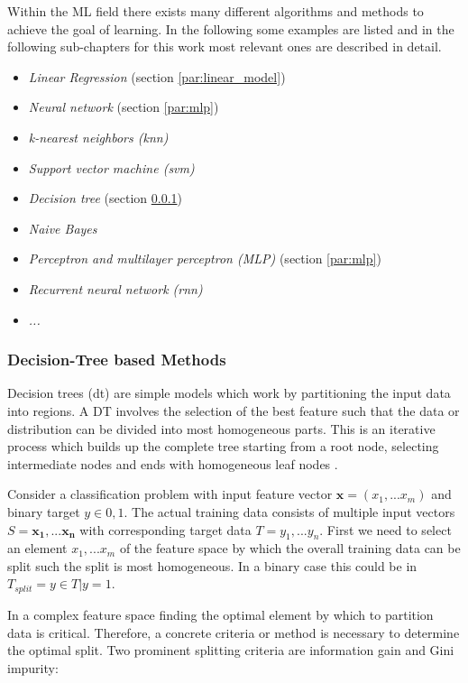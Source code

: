 \documentclass[../main.tex]{subfiles}
\begin{document}
Within the ML field there exists many different algorithms and methods to achieve the goal of learning. In the following some examples are listed and in the following sub-chapters for this work most relevant ones are described in detail.

\begin{itemize}
    \item \emph{Linear Regression} (section \ref{par:linear_model})
    \item \emph{Neural network} (section \ref{par:mlp})
    \item \emph{k-nearest neighbors (\acs{knn})}
    \item \emph{Support vector machine (\acs{svm})}
    \item \emph{Decision tree} (section \ref{ssec:dt})
    \item \emph{Naive Bayes}
    \item \emph{Perceptron and multilayer perceptron (MLP)} (section \ref{par:mlp})
    \item \emph{Recurrent neural network (\acs{rnn})}
    \item \emph{...}
\end{itemize}

\subsubsection{Decision-Tree based Methods} \label{ssec:dt}

Decision trees (\acs{dt}) are simple models which work by partitioning the input data into regions. A DT involves the selection of the best feature such that the data or distribution can be divided into most homogeneous parts. This is an iterative process which builds up the complete tree starting from a root node, selecting intermediate nodes and ends with homogeneous leaf nodes \cite{kotsiantis_decision_2013}.

Consider a classification problem with input feature vector $\mathbf{x} = (x_1, ... x_m)$ and binary target $y \in {0, 1}$. The actual training data consists of multiple input vectors $S={\mathbf{x_1},...\mathbf{x_n}}$ with corresponding target data $T={y_1,...y_n}$. First we need to select an element $x_1,...x_m$ of the feature space by which the overall training data can be split such the split is most homogeneous. In a binary case this could be in $T_{split}={y\in T | y = 1}$. 

In a complex feature space finding the optimal element by which to partition data is critical. Therefore, a concrete criteria or method is necessary to determine the optimal split. Two prominent splitting criteria are information gain and Gini impurity:
\end{document}
